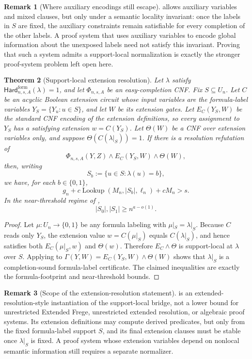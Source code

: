 \documentclass[11pt]{article}
\newtheorem{theorem}{Theorem}[section]
\theoremstyle{definition}
\newtheorem{remark}[theorem]{Remark}
\newcommand{\bits}{\{0,1\}}
\newcommand{\Lookup}{\operatorname{Lookup}}
\newcommand{\HardF}{\mathsf{Hard}^{\mathrm{form}}}
\begin{document}
\begin{remark}[Where auxiliary encodings still escape]\label{rem:support-local-aux-scope}
 allows auxiliary variables and mixed clauses, but only under a semantic locality invariant: once the labels in \(S\) are fixed, the auxiliary constraints remain satisfiable for every completion of the other labels.  A proof system that uses auxiliary variables to encode global information about the unexposed labels need not satisfy this invariant.  Proving that such a system admits a support-local normalization is exactly the stronger proof-system problem left open here.
\end{remark}

\begin{theorem}[Support-local extension resolution]\label{thm:support-local-extension-resolution}
Let \(\lambda\) satisfy \(\HardF_{n,s,A}(\lambda)=1\), and let \(\Phi_{n,s,A}\) be an easy-completion CNF.  Fix \(S\subseteq U_n\).  Let \(C\) be an acyclic Boolean extension circuit whose input variables are the formula-label variables \(Y_S=\{Y_u:u\in S\}\), and let \(W\) be its extension gates.  Let \(E_C(Y_S,W)\) be the standard CNF encoding of the extension definitions, so every assignment to \(Y_S\) has a satisfying extension \(w=C(Y_S)\).  Let \(\Theta(W)\) be a CNF over extension variables only, and suppose \(\Theta(C(\lambda|_S))=1\).  If there is a resolution refutation of
\[
  \Phi_{n,s,A}(Y,Z)\wedge E_C(Y_S,W)\wedge \Theta(W),
\]
then, writing
\[
  S_b:=\{u\in S:\lambda(u)=b\},
\]
we have, for each \(b\in\bits\),
\[
  g_n+c\Lookup(M_n,|S_b|,\ell_n)+cM_n>s.
\]
In the near-threshold regime of ,
\[
  |S_0|,|S_1|\ge n^{a-o(1)}.
\]
\end{theorem}

\begin{proof}
Let \(\mu:U_n\to\bits\) be any formula labeling with \(\mu|_S=\lambda|_S\).  Because \(C\) reads only \(Y_S\), the extension value \(w=C(\mu|_S)\) equals \(C(\lambda|_S)\), and hence satisfies both \(E_C(\mu|_S,w)\) and \(\Theta(w)\).  Therefore \(E_C\wedge\Theta\) is support-local at \(\lambda\) over \(S\).  Applying  to \(\Gamma(Y,W)=E_C(Y_S,W)\wedge\Theta(W)\) shows that \(\lambda|_S\) is a completion-sound formula-label certificate.  The claimed inequalities are exactly the formula-footprint and near-threshold bounds.
\end{proof}

\begin{remark}[Scope of the extension-resolution statement]\label{rem:support-local-er-scope}
 is an extended-resolution-style instantiation of the support-local bridge, not a lower bound for unrestricted Extended Frege, unrestricted extended resolution, or algebraic proof systems.  Its extension definitions may compute derived predicates, but only from the fixed formula-label support \(S\), and its final extension clauses must be stable once \(\lambda|_S\) is fixed.  A proof system whose extension variables depend on nonlocal semantic information still requires a separate normalizer.
\end{remark}
\end{document}
